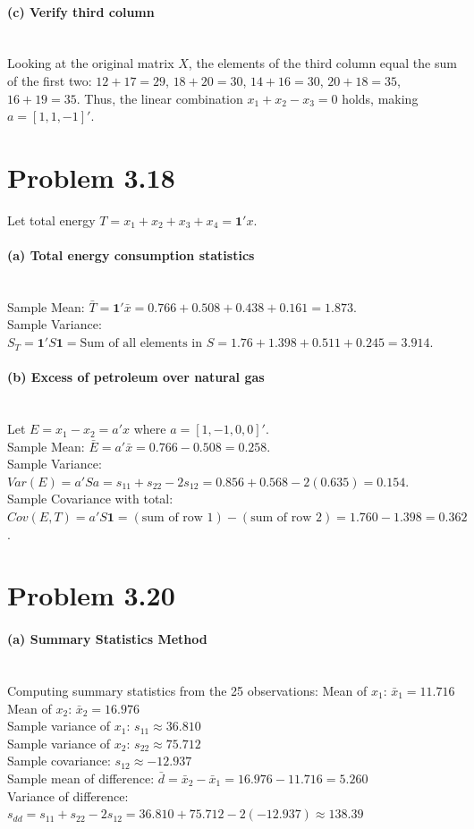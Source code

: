 \documentclass[12pt]{article}
\begin{document}
\paragraph{(c) Verify third column} \mbox{} \\
Looking at the original matrix $X$, the elements of the third column equal the sum of the first two: $12+17=29$, $18+20=30$, $14+16=30$, $20+18=35$, $16+19=35$. Thus, the linear combination $x_1 + x_2 - x_3 = 0$ holds, making $a = [1, 1, -1]'$.

\section*{Problem 3.18} 
Let total energy $T = x_1+x_2+x_3+x_4 = \mathbf{1}'x$.

\paragraph{(a) Total energy consumption statistics} \mbox{} \\
Sample Mean: $\bar{T} = \mathbf{1}'\bar{x} = 0.766 + 0.508 + 0.438 + 0.161 = 1.873$. \\
Sample Variance: $S_T = \mathbf{1}'S\mathbf{1} = \text{Sum of all elements in } S = 1.76 + 1.398 + 0.511 + 0.245 = 3.914$.

\paragraph{(b) Excess of petroleum over natural gas} \mbox{} \\
Let $E = x_1 - x_2 = a'x$ where $a = [1, -1, 0, 0]'$. \\
Sample Mean: $\bar{E} = a'\bar{x} = 0.766 - 0.508 = 0.258$. \\
Sample Variance: $Var(E) = a'Sa = s_{11} + s_{22} - 2s_{12} = 0.856 + 0.568 - 2(0.635) = 0.154$. \\
Sample Covariance with total: $Cov(E, T) = a'S\mathbf{1} = (\text{sum of row 1}) - (\text{sum of row 2}) = 1.760 - 1.398 = 0.362$.

\section*{Problem 3.20} 

\paragraph{(a) Summary Statistics Method} \mbox{} \\
Computing summary statistics from the 25 observations:
Mean of $x_1$: $\bar{x}_1 = 11.716$ \\
Mean of $x_2$: $\bar{x}_2 = 16.976$ \\
Sample variance of $x_1$: $s_{11} \approx 36.810$ \\
Sample variance of $x_2$: $s_{22} \approx 75.712$ \\
Sample covariance: $s_{12} \approx -12.937$ \\
Sample mean of difference: $\bar{d} = \bar{x}_2 - \bar{x}_1 = 16.976 - 11.716 = 5.260$ \\
Variance of difference: $s_{dd} = s_{11} + s_{22} - 2s_{12} = 36.810 + 75.712 - 2(-12.937) \approx 138.39$
\end{document}
